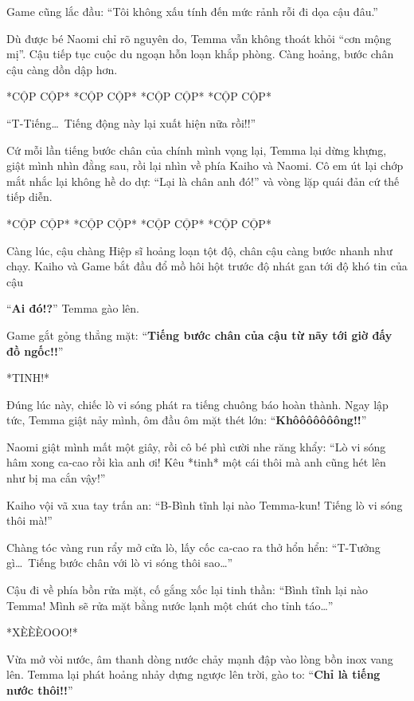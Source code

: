 \documentclass[../main.tex]{subfiles}
\begin{document}
Game cũng lắc đầu: ``Tôi không xấu tính đến mức rảnh rỗi đi dọa cậu đâu.''

Dù được bé Naomi chỉ rõ nguyên do, Temma vẫn không thoát khỏi ``cơn mộng mị''. Cậu tiếp tục cuộc du ngoạn hỗn loạn khắp phòng. Càng hoảng, bước chân cậu càng dồn dập hơn.

*CỘP CỘP* *CỘP CỘP* *CỘP CỘP* *CỘP CỘP*

``T-Tiếng\dots\ Tiếng động này lại xuất hiện nữa rồi!!''

Cứ mỗi lần tiếng bước chân của chính mình vọng lại, Temma lại dừng khựng, giật mình nhìn đằng sau, rồi lại nhìn về phía Kaiho và Naomi. Cô em út lại chớp mắt nhắc lại không hề do dự: ``Lại là chân anh đó!'' và vòng lặp quái đản cứ thế tiếp diễn.

*CỘP CỘP* *CỘP CỘP* *CỘP CỘP* *CỘP CỘP*

Càng lúc, cậu chàng Hiệp sĩ hoảng loạn tột độ, chân cậu càng bước nhanh như chạy. Kaiho và Game bắt đầu đổ mồ hôi hột trước độ nhát gan tới độ khó tin của cậu

``\textbf{Ai đó!?}'' Temma gào lên.

Game gắt gỏng thẳng mặt: ``\textbf{Tiếng bước chân của cậu từ nãy tới giờ đấy đồ ngốc!!}''

*TINH!*

Đúng lúc này, chiếc lò vi sóng phát ra tiếng chuông báo hoàn thành. Ngay lập tức, Temma giật nảy mình, ôm đầu ôm mặt thét lớn: ``\textbf{Khôôôôôôông!!}''


Naomi giật mình mất một giây, rồi cô bé phì cười nhe răng khẩy: ``Lò vi sóng hâm xong ca-cao rồi kìa anh ơi! Kêu *tinh* một cái thôi mà anh cũng hét lên như bị ma cắn vậy!''

Kaiho vội vã xua tay trấn an: ``B-Bình tĩnh lại nào Temma-kun! Tiếng lò vi sóng thôi mà!''

Chàng tóc vàng run rẩy mở cửa lò, lấy cốc ca-cao ra thở hổn hển: ``T-Tưởng gì\dots\ Tiếng bước chân với lò vi sóng thôi sao\dots''

Cậu đi về phía bồn rửa mặt, cố gắng xốc lại tinh thần: ``Bình tĩnh lại nào Temma! Mình sẽ rửa mặt bằng nước lạnh một chút cho tỉnh táo\dots''

*XÈÈÈOOO!*

Vừa mở vòi nước, âm thanh dòng nước chảy mạnh đập vào lòng bồn inox vang lên. Temma lại phát hoảng nhảy dựng ngược lên trời, gào to: ``\textbf{Chỉ là tiếng nước thôi!!}''

\end{document}
